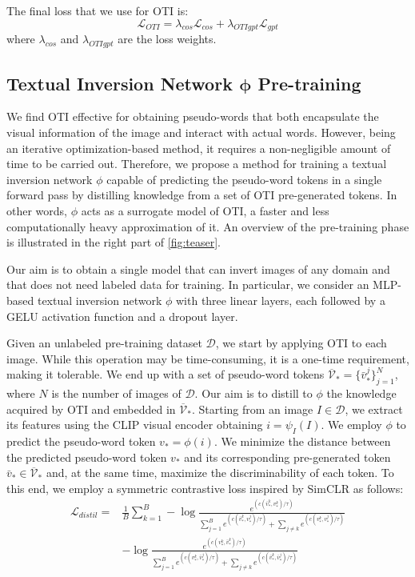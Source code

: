 \documentclass[10pt,twocolumn,letterpaper]{article}
\DeclareRobustCommand{\vect}[1]{\bm{#1}}
\begin{document}
The final loss that we use for OTI is:
\begin{equation}\label{eq:loss_oti}
     \mathcal{L}_{OTI} =  \lambda_{cos} \mathcal{L}_{cos} + \lambda_{OTIgpt} \mathcal{L}_{gpt}
\end{equation}
where $\lambda_{cos}$ and $\lambda_{OTIgpt}$ are the loss weights.

\subsection{Textual Inversion Network $\vect{\phi}$ Pre-training}\label{sec:distillation}
We find OTI effective for obtaining pseudo-words that both encapsulate the visual information of the image and interact with actual words. However, being an iterative optimization-based method, it requires a non-negligible amount of time to be carried out. Therefore, we propose a method for training a textual inversion network $\phi$ capable of predicting the pseudo-word tokens in a single forward pass by distilling knowledge from a set of OTI pre-generated tokens. In other words, $\phi$ acts as a surrogate model of OTI, \ie a faster and less computationally heavy approximation of it. An overview of the pre-training phase is illustrated in the right part of \cref{fig:teaser}.

Our aim is to obtain a single model that can invert images of any domain and that does not need labeled data for training. In particular, we consider an MLP-based textual inversion network $\phi$ with three linear layers, each followed by a GELU \cite{hendrycks2016gaussian} activation function and a dropout layer. 

Given an unlabeled pre-training dataset $\mathcal{D}$, we start by applying OTI to each image. While this operation may be time-consuming, it is a one-time requirement, making it tolerable. We end up with a set of pseudo-word tokens $\overline{\mathcal{V}}_* = \{{\bar{v}_*^j}\}_{j=1}^N$, where $N$ is the number of images of $\mathcal{D}$. Our aim is to distill to $\phi$ the knowledge acquired by OTI and embedded in $\overline{\mathcal{V}}_*$. Starting from an image $I \in \mathcal{D}$, we extract its features using the CLIP visual encoder obtaining $i = \psi_{I}(I)$. We employ $\phi$ to predict the pseudo-word token $v_* = \phi(i)$.  We minimize the distance between the predicted pseudo-word token $v_*$ and its corresponding pre-generated token $\bar{v}_* \in \overline{\mathcal{V}}_*$ and, at the same time, maximize the discriminability of each token.
To this end, we employ a symmetric contrastive loss inspired by SimCLR \cite{chen2020simple, cohen2022this} as follows:
\begin{align} \label{eq:loss_distil}
    \mathcal{L}_{distil} = &\frac{1}{B} \sum^{B}_{k=1} -\log{\frac{e^{( c(\bar{v}_*^k, v_*^k) / \tau )}}{\sum\limits^B_{j=1} {e^{( c(\bar{v}_*^k, v_*^j) / \tau )}}+ {\sum\limits_{j\neq k} {e^{( c(v_*^k, v_*^j) / \tau )}}} }}\nonumber \\ 
    &- \log{\frac{e^{( c(v_*^k, \bar{v}_*^k) / \tau )}}{\sum\limits^B_{j=1} {e^{( c(v_*^k, \bar{v}_*^j) / \tau )}}+ {\sum\limits_{j\neq k} {e^{( c(\bar{v}_*^k, \bar{v}_*^j) / \tau )}}} }} 
\end{align}
\end{document}
